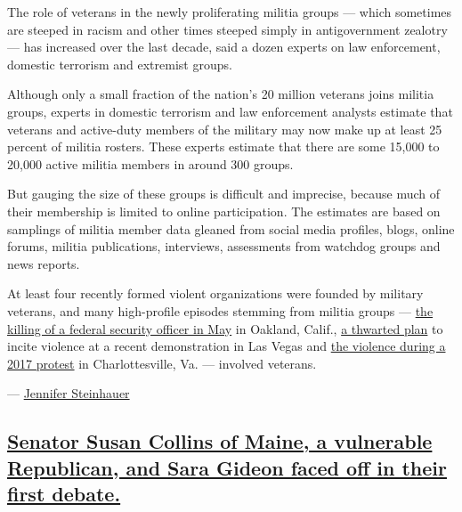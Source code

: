 The role of veterans in the newly proliferating militia groups --- which
sometimes are steeped in racism and other times steeped simply in
antigovernment zealotry --- has increased over the last decade, said a
dozen experts on law enforcement, domestic terrorism and extremist
groups.

Although only a small fraction of the nation's 20 million veterans joins
militia groups, experts in domestic terrorism and law enforcement
analysts estimate that veterans and active-duty members of the military
may now make up at least 25 percent of militia rosters. These experts
estimate that there are some 15,000 to 20,000 active militia members in
around 300 groups.

But gauging the size of these groups is difficult and imprecise, because
much of their membership is limited to online participation. The
estimates are based on samplings of militia member data gleaned from
social media profiles, blogs, online forums, militia publications,
interviews, assessments from watchdog groups and news reports.

At least four recently formed violent organizations were founded by
military veterans, and many high-profile episodes stemming from militia
groups ---
\href{https://www.nytimes3xbfgragh.onion/2020/06/16/us/steven-carrillo-air-force-boogaloo.html}{the
killing of a federal security officer in May} in Oakland, Calif.,
\href{https://apnews.com/6223153093f08fa910c4ab445771b773}{a thwarted
plan} to incite violence at a recent demonstration in Las Vegas and
\href{https://www.propublica.org/article/atomwaffen-division-hate-group-active-duty-military}{the
violence during a 2017 protest} in Charlottesville, Va. --- involved
veterans.

---
\href{https://www.nytimes3xbfgragh.onion/by/jennifer-steinhauer}{Jennifer
Steinhauer}

\hypertarget{senator-susan-collins-of-maine-a-vulnerable-republican-and-sara-gideon-faced-off-in-their-first-debate}{%
\subsection{\texorpdfstring{\protect\hyperlink{senator-susan-collins-of-maine-a-vulnerable-republican-and-sara-gideon-faced-off-in-their-first-debate}{Senator
Susan Collins of Maine, a vulnerable Republican, and Sara Gideon faced
off in their first
debate.}}{Senator Susan Collins of Maine, a vulnerable Republican, and Sara Gideon faced off in their first debate.}}\label{senator-susan-collins-of-maine-a-vulnerable-republican-and-sara-gideon-faced-off-in-their-first-debate}}

